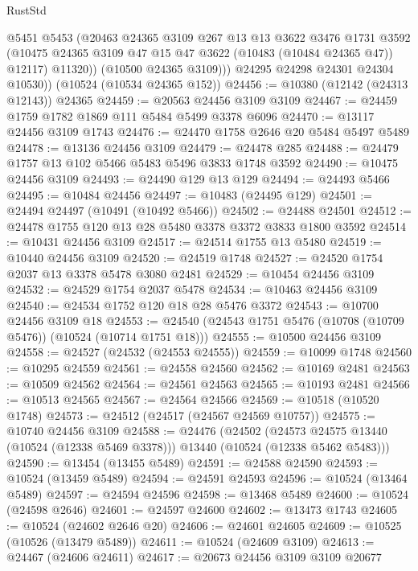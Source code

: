 \begin{lexlean}{RustStd}
\begin{coremodule}
              @5451
              @5453
              (@20463
                @24365
                @3109
                @267
                @13
                @13
                @3622
                @3476
                @1731
                @3592
                (@10475 @24365 @3109 @47 @15 @47 @3622 (@10483 (@10484 @24365 @47)) @12117)
                @11320))
            (@10500 @24365 @3109)))
        @24295
        @24298
        @24301
        @24304
        @10530))
    (@10524 (@10534 @24365 @152))
@24456 := @10380 (@12142 (@24313 @12143)) @24365
@24459 := @20563 @24456 @3109 @3109
@24467 := @24459 @1759 @1782 @1869 @111 @5484 @5499 @3378 @6096
@24470 := @13117 @24456 @3109 @1743
@24476 := @24470 @1758 @2646 @20 @5484 @5497 @5489
@24478 := @13136 @24456 @3109
@24479 := @24478 @285
@24488 := @24479 @1757 @13 @102 @5466 @5483 @5496 @3833 @1748 @3592
@24490 := @10475 @24456 @3109
@24493 := @24490 @129 @13 @129
@24494 := @24493 @5466
@24495 := @10484 @24456
@24497 := @10483 (@24495 @129)
@24501 := @24494 @24497 (@10491 (@10492 @5466))
@24502 := @24488 @24501
@24512 := @24478 @1755 @120 @13 @28 @5480 @3378 @3372 @3833 @1800 @3592
@24514 := @10431 @24456 @3109
@24517 := @24514 @1755 @13 @5480
@24519 := @10440 @24456 @3109
@24520 := @24519 @1748
@24527 := @24520 @1754 @2037 @13 @3378 @5478 @3080 @2481
@24529 := @10454 @24456 @3109
@24532 := @24529 @1754 @2037 @5478
@24534 := @10463 @24456 @3109
@24540 := @24534 @1752 @120 @18 @28 @5476 @3372
@24543 := @10700 @24456 @3109 @18
@24553 := @24540 (@24543 @1751 @5476 (@10708 (@10709 @5476)) (@10524 (@10714 @1751 @18)))
@24555 := @10500 @24456 @3109
@24558 := @24527 (@24532 (@24553 @24555))
@24559 := @10099 @1748
@24560 := @10295 @24559
@24561 := @24558 @24560
@24562 := @10169 @2481
@24563 := @10509 @24562
@24564 := @24561 @24563
@24565 := @10193 @2481
@24566 := @10513 @24565
@24567 := @24564 @24566
@24569 := @10518 (@10520 @1748)
@24573 := @24512 (@24517 (@24567 @24569 @10757))
@24575 := @10740 @24456 @3109
@24588 := @24476
    (@24502
      (@24573 @24575 @13440 (@10524 (@12338 @5469 @3378)))
      @13440
      (@10524 (@12338 @5462 @5483)))
@24590 := @13454 (@13455 @5489)
@24591 := @24588 @24590
@24593 := @10524 (@13459 @5489)
@24594 := @24591 @24593
@24596 := @10524 (@13464 @5489)
@24597 := @24594 @24596
@24598 := @13468 @5489
@24600 := @10524 (@24598 @2646)
@24601 := @24597 @24600
@24602 := @13473 @1743
@24605 := @10524 (@24602 @2646 @20)
@24606 := @24601 @24605
@24609 := @10525 (@10526 (@13479 @5489))
@24611 := @10524 (@24609 @3109)
@24613 := @24467 (@24606 @24611)
@24617 := @20673 @24456 @3109 @3109 @20677

\end{coremodule}
\end{lexlean}
